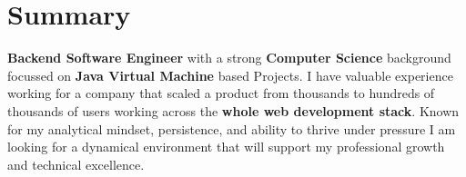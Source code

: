 \documentclass{style/modernsimplecv}
\begin{document}
\subsection*{}
\vspace{-3em}
\begin{minipage}{0.99\textwidth}
\section*{Summary}
    \textbf{Backend Software Engineer} with a strong \textbf{Computer Science} background focussed on \textbf{Java Virtual Machine} based Projects. I have valuable experience working for a company that scaled a product from thousands to hundreds of thousands of users working across the \textbf{whole web development stack}. Known for my analytical mindset, persistence, and ability to thrive under pressure I am looking for a dynamical environment that will support my professional growth and technical excellence.
\end{minipage}
\bigskip
\end{document}
